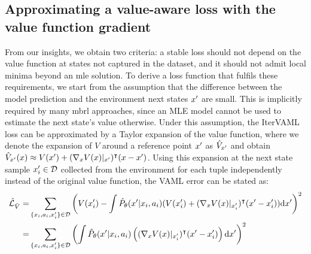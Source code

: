 
\subsection{Approximating a value-aware loss with the value function gradient}
From our insights, we obtain two criteria: a stable loss should not depend on the value function at states not captured in the dataset, and it should not admit local minima beyond an \ac{mle} solution.
To derive a loss function that fulfils these requirements, we start from the assumption that the difference between the model prediction and the environment next states $x'$ are small.
This is implicitly required by many \ac{mbrl} approaches, since an MLE model cannot be used to estimate the next state's value otherwise. 
Under this assumption, the IterVAML loss can be approximated by a Taylor expansion of the value function, where we denote the expansion of $V$ around a reference point $x'$ as $\hat{V}_{x'}$ and obtain $\hat{V}_{x'}(x) \approx V(x') + (\nabla_x V(x)|_{x'})^\intercal (x - x')$.
Using this expansion at the next state sample $x'_i \in \mathcal{D}$ collected from the environment for each tuple independently instead of the original value function, the VAML error can be stated as:
\begin{align}
    \hat{\mathcal{L}}_{\hat{V}}=&\sum_{\{x_i,a_i,x'_i\}\in\mathcal{D}}{\left(V(x'_i) - \int \hat{P}_\theta(x'|x_i,a_i) (V(x'_i) + (\nabla_x V(x)|_{x'_i})^\intercal (x' - x'_i)) \mathrm{d}x'\right)^2}\\
    =&\sum_{\{x_i,a_i,x'_i\}\in\mathcal{D}} {\left(\int \hat{P}_\theta(x'|x_i,a_i) \left((\nabla_x V(x)|_{x'_i})^\intercal(x' - x'_i) \right) \mathrm{d}x'\right)^2}
\end{align}


